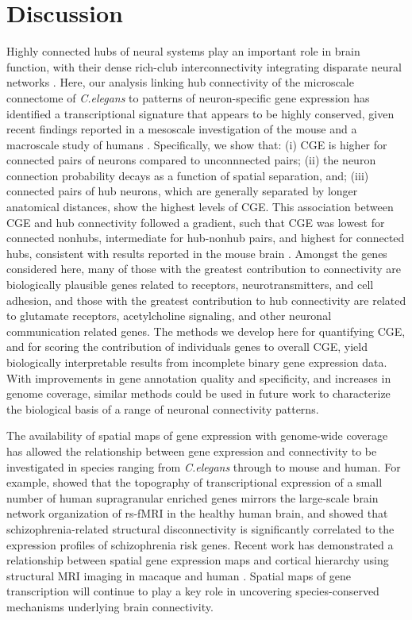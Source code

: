 {\section{Discussion}
Highly connected hubs of neural systems play an important role in brain function, with their dense rich-club interconnectivity integrating disparate neural networks \citep{VandenHeuvel2013b, Fornito2015, DeReus2013b, VandenHeuvel2013a}.
Here, our analysis linking hub connectivity of the microscale connectome of \emph{C.elegans} to patterns of neuron-specific gene expression has identified a transcriptional signature that appears to be highly conserved, given recent findings reported in a mesoscale investigation of the mouse \citep{Fulcher2016} and a macroscale study of humans \citep{Vertes2016b}.
Specifically, we show that:
(i) CGE is higher for connected pairs of neurons compared to unconnnected pairs;
(ii) the neuron connection probability decays as a function of spatial separation, and;
(iii) connected pairs of hub neurons, which are generally separated by longer anatomical distances, show the highest levels of CGE.
This association between CGE and hub connectivity followed a gradient, such that CGE was lowest for connected nonhubs, intermediate for hub-nonhub pairs, and highest for connected hubs, consistent with results reported in the mouse brain \citep{Fulcher2016}.
Amongst the genes considered here, many of those with the greatest contribution to connectivity are biologically plausible genes related to receptors, neurotransmitters, and cell adhesion, and those with the greatest contribution to hub connectivity are related to glutamate receptors, acetylcholine signaling, and other neuronal communication related genes.
The methods we develop here for quantifying CGE, and for scoring the contribution of individuals genes to overall CGE, yield biologically interpretable results from incomplete binary gene expression data.
With improvements in gene annotation quality and specificity, and increases in genome coverage, similar methods could be used in future work to characterize the biological basis of a range of neuronal connectivity patterns.

The availability of spatial maps of gene expression with genome-wide coverage has allowed the relationship between gene expression and connectivity to be investigated in species ranging from \textit{C.elegans} through to mouse and human.
For example, \citet{Krienen2016} showed that the topography of transcriptional expression of a small number of human supragranular enriched genes mirrors the large-scale brain network organization of rs-fMRI in the healthy human brain, and \citet{Romme2017} showed that schizophrenia-related structural disconnectivity is significantly correlated to the expression profiles of schizophrenia risk genes.
Recent work has demonstrated a relationship between spatial gene expression maps and cortical hierarchy using structural MRI imaging in macaque and human \citep{Burt2018}.
Spatial maps of gene transcription will continue to play a key role in uncovering species-conserved mechanisms underlying brain connectivity.

}
